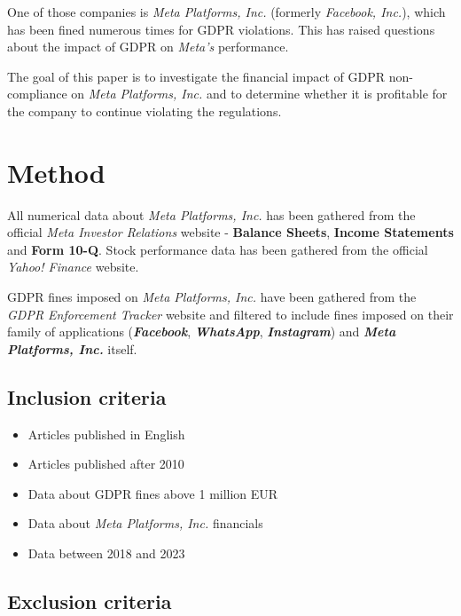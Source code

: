 \documentclass[12pt, a4paper]{article}
\begin{document}
One of those companies is \textit{Meta Platforms, Inc.} (formerly
\textit{Facebook, Inc.}), which has been fined numerous times for GDPR
violations\cite{mrevzar2023analysis}. This has raised questions about the impact
of GDPR on \textit{Meta's} performance.

The goal of this paper is to investigate the financial impact of GDPR
non-compliance on \textit{Meta Platforms, Inc.} and to determine whether it is
profitable for the company to continue violating the regulations.

\section*{Method}

All numerical data about \textit{Meta Platforms, Inc.} has been gathered from
the official \textit{Meta Investor Relations} website\cite{fbMetaFinancials} -
\textbf{Balance Sheets}, \textbf{Income Statements} and \textbf{Form 10-Q}.
Stock performance data has been gathered from the official \textit{Yahoo!
Finance} website\cite{stockPrice}.

GDPR fines imposed on \textit{Meta Platforms, Inc.} have been gathered from the
\textit{GDPR Enforcement Tracker}
website\cite{enforcementtrackerGDPREnforcement} and filtered to include fines
imposed on their family of applications (\textbf{\textit{Facebook}},
\textbf{\textit{WhatsApp}}, \textbf{\textit{Instagram}}) and
\textbf{\textit{Meta Platforms, Inc.}} itself.

\subsection*{Inclusion criteria}

\begin{itemize}
    \item Articles published in English
    \item Articles published after 2010
    \item Data about GDPR fines above 1 million EUR
    \item Data about \textit{Meta Platforms, Inc.} financials
    \item Data between 2018 and 2023
\end{itemize}

\subsection*{Exclusion criteria}
\end{document}
